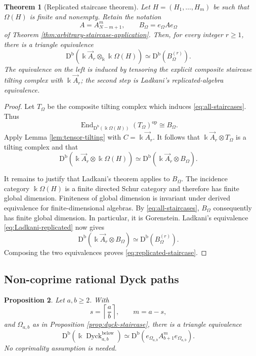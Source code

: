 \documentclass[12pt,a4paper,english,reqno]{amsart}
\theoremstyle{plain}
\newtheorem{theorem}{Theorem}[section]
\newtheorem{proposition}[theorem]{Proposition}
\theoremstyle{definition}
\newcommand{\kk}{\Bbbk}
\newcommand{\Db}{\mathrm D^{\mathrm b}}
\newcommand{\End}{\operatorname{End}}
\newcommand{\Dyck}{\operatorname{Dyck}}
\newcommand{\op}{\mathrm{op}}
\begin{document}
\begin{theorem}[Replicated staircase theorem]
\label{thm:replicated-staircase}
Let $H=(H_1,\ldots,H_m)$ be such that $\Omega(H)$ is finite and
nonempty.  Retain the notation
\[
 A=A_{N-m+1}^{m},
 \qquad
 B_\Omega=e_\Omega Ae_\Omega
\]
of Theorem \ref{thm:arbitrary-staircase-application}.  Then, for every integer
$r\geq1$, there is a triangle equivalence
\begin{equation}
 \Db\!\left(
 \kk\vec A_r\otimes_{\kk}\kk\Omega(H)
 \right)
 \simeq
 \Db\!\left(B_\Omega^{(r)}\right).
\label{eq:replicated-staircase}
\end{equation}
The equivalence on the left is induced by tensoring the explicit composite
staircase tilting complex with $\kk\vec A_r$; the second step is
Ladkani's replicated-algebra equivalence.
\end{theorem}

\begin{proof}
Let $T_\Omega$ be the composite tilting complex which induces
\eqref{eq:all-staircases}.  Thus
\[
 \End_{\Db(\kk\Omega(H))}(T_\Omega)^{\op}
 \cong B_\Omega.
\]
Apply Lemma \ref{lem:tensor-tilting} with
$C=\kk\vec A_r$.  It follows that
$\kk\vec A_r\otimes T_\Omega$ is a tilting complex and that
\[
 \Db\!\left(
 \kk\vec A_r\otimes\kk\Omega(H)
 \right)
 \simeq
 \Db\!\left(
 \kk\vec A_r\otimes B_\Omega
 \right).
\]

It remains to justify that Ladkani's theorem applies to $B_\Omega$.
The incidence category $\kk\Omega(H)$ is a finite directed Schur
category and therefore has finite global dimension.  Finiteness of global
dimension is invariant under derived equivalence for finite-dimensional
algebras.  By \eqref{eq:all-staircases}, $B_\Omega$ consequently has
finite global dimension.  In particular, it is Gorenstein.
Ladkani's equivalence \eqref{eq:Ladkani-replicated} now gives
\[
 \Db\!\left(
 \kk\vec A_r\otimes B_\Omega
 \right)
 \simeq
 \Db\!\left(B_\Omega^{(r)}\right).
\]
Composing the two equivalences proves
\eqref{eq:replicated-staircase}.
\end{proof}

\subsection{Non-coprime rational Dyck paths}

\begin{proposition}
\label{prop:noncoprime-application}
Let $a,b\geq2$.  With
\[
 s=\left\lceil\frac ab\right\rceil,\qquad m=a-s,
\]
and $\Omega_{a,b}$ as in Proposition \ref{prop:dyck-staircase}, there is a triangle
equivalence
\begin{equation}
 \Db(\kk\Dyck^{\mathrm{below}}_{a,b})
 \simeq
 \Db\!\left(
 e_{\Omega_{a,b}}A_{b+1}^{m}e_{\Omega_{a,b}}
 \right).
\label{eq:noncoprime-corner}
\end{equation}
No coprimality assumption is needed.
\end{proposition}
\end{document}
